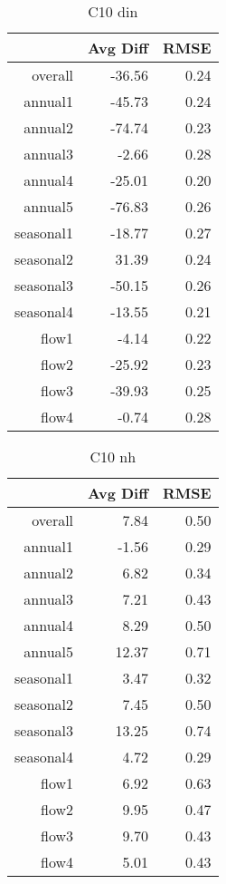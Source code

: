 \begin{table}[H]
\centering
\begin{tabular}{rrr}
  \hline
 & Avg Diff & RMSE \\ 
  \hline
overall & -36.56 & 0.24 \\ 
  annual1 & -45.73 & 0.24 \\ 
  annual2 & -74.74 & 0.23 \\ 
  annual3 & -2.66 & 0.28 \\ 
  annual4 & -25.01 & 0.20 \\ 
  annual5 & -76.83 & 0.26 \\ 
  seasonal1 & -18.77 & 0.27 \\ 
  seasonal2 & 31.39 & 0.24 \\ 
  seasonal3 & -50.15 & 0.26 \\ 
  seasonal4 & -13.55 & 0.21 \\ 
  flow1 & -4.14 & 0.22 \\ 
  flow2 & -25.92 & 0.23 \\ 
  flow3 & -39.93 & 0.25 \\ 
  flow4 & -0.74 & 0.28 \\ 
   \hline
\end{tabular}
\caption{C10 din} 
\end{table}
\begin{table}[H]
\centering
\begin{tabular}{rrr}
  \hline
 & Avg Diff & RMSE \\ 
  \hline
overall & 7.84 & 0.50 \\ 
  annual1 & -1.56 & 0.29 \\ 
  annual2 & 6.82 & 0.34 \\ 
  annual3 & 7.21 & 0.43 \\ 
  annual4 & 8.29 & 0.50 \\ 
  annual5 & 12.37 & 0.71 \\ 
  seasonal1 & 3.47 & 0.32 \\ 
  seasonal2 & 7.45 & 0.50 \\ 
  seasonal3 & 13.25 & 0.74 \\ 
  seasonal4 & 4.72 & 0.29 \\ 
  flow1 & 6.92 & 0.63 \\ 
  flow2 & 9.95 & 0.47 \\ 
  flow3 & 9.70 & 0.43 \\ 
  flow4 & 5.01 & 0.43 \\ 
   \hline
\end{tabular}
\caption{C10 nh} 
\end{table}
